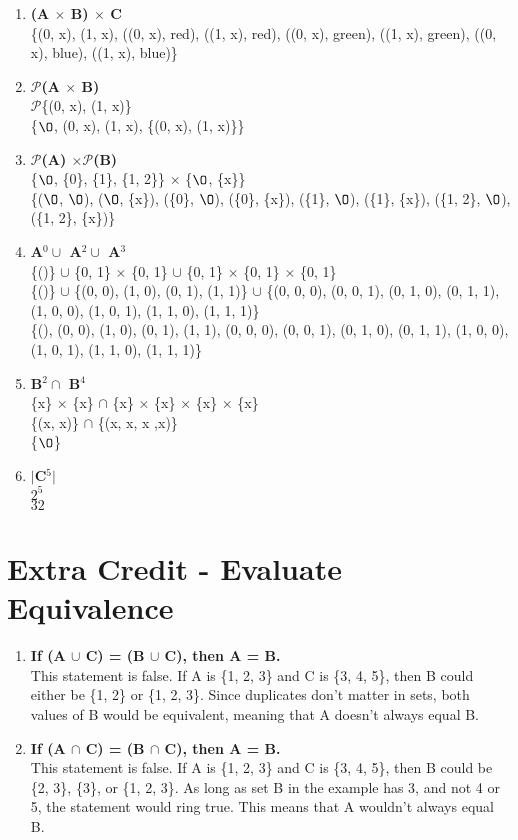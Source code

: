 \documentclass[a4paper]{article}
\begin{document}
\begin{enumerate}
    \item \textbf{(A $\times$ B) $\times$ C} \\
    \{(0, x), (1, x), ((0, x), red), ((1, x), red), ((0, x), green), ((1, x), green), ((0, x), blue), ((1, x), blue)\}
    \item \textbf{$\mathcal{P}$(A $\times$ B)} \\
    $\mathcal{P}$\{(0, x), (1, x)\} \\
    \{$\O$, (0, x), (1, x), \{(0, x), (1, x)\}\}
    \item \textbf{$\mathcal{P}$(A) $\times \mathcal{P}$(B)} \\
    \{$\O$, \{0\}, \{1\}, \{1, 2\}\} $\times$ \{$\O$, \{x\}\} \\
    \{($\O$, $\O$), ($\O$, \{x\}), (\{0\}, $\O$), (\{0\}, \{x\}), (\{1\}, $\O$), (\{1\}, \{x\}), (\{1, 2\}, $\O$), (\{1, 2\}, \{x\})\}
    \item \textbf{A$^0 \cup $ A$^2 \cup$ A$^3$} \\
    \{()\} $\cup$ \{0, 1\} $\times$ \{0, 1\} $\cup$ \{0, 1\} $\times$ \{0, 1\} $\times$ \{0, 1\} \\
    \{()\} $\cup$ \{(0, 0), (1, 0), (0, 1), (1, 1)\} $\cup$ \{(0, 0, 0), (0, 0, 1), (0, 1, 0), (0, 1, 1), (1, 0, 0), (1, 0, 1), (1, 1, 0), (1, 1, 1)\} \\
    \{(), (0, 0), (1, 0), (0, 1), (1, 1), (0, 0, 0), (0, 0, 1), (0, 1, 0), (0, 1, 1), (1, 0, 0), (1, 0, 1), (1, 1, 0), (1, 1, 1)\}
    \item \textbf{B$^2 \cap$ B$^4$} \\
    \{x\} $\times$ \{x\} $\cap$ \{x\} $\times$ \{x\} $\times$ \{x\} $\times$ \{x\} \\
    \{(x, x)\} $\cap$ \{(x, x, x ,x)\} \\
    \{$\O$\}
    \item \textbf{$|$C$^5|$} \\
    $2^5$\\
    $32$
\end{enumerate}

\section{Extra Credit - Evaluate Equivalence}
\begin{enumerate}
    \item \textbf{If (A $\cup$ C) = (B $\cup$ C), then A = B.}\\
    This statement is false. If A is \{1, 2, 3\} and C is \{3, 4, 5\}, then B could either be \{1, 2\} or \{1, 2, 3\}. Since duplicates don't matter in sets, both values of B would be equivalent, meaning that A doesn't always equal B.
    \item \textbf{If (A $\cap$ C) = (B $\cap$ C), then A = B.}\\
    This statement is false. If A is \{1, 2, 3\} and C is \{3, 4, 5\}, then B could be \{2, 3\}, \{3\}, or \{1, 2, 3\}. As long as set B in the example has 3, and not 4 or 5, the statement would ring true. This means that A wouldn't always equal B.
\end{enumerate}
\end{document}

